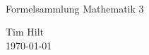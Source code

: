 \begin{titlepage}

  \\ \vspace{3cm}
  
  \begin{center}
    {
      \Huge Formelsammlung Mathematik 3}
    \vspace{0.5cm}
    
    \begin{Large}
      Tim Hilt\\
      \vspace{0.4cm}
      \today\\
    \end{Large}
    
  \end{center}
\end{titlepage}
\restoregeometry

